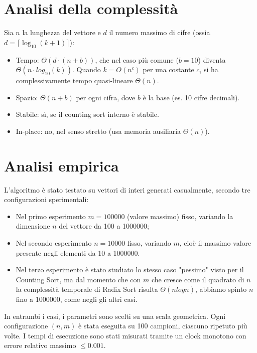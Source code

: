 \documentclass[a4paper, 12pt, oneside]{book}
\begin{document}
\section{Analisi della complessità}
Sia \(n\) la lunghezza del vettore e \(d\) il numero massimo di cifre (ossia \( d = \lceil \log_{10}(k + 1) \rceil \)): \\

\begin{itemize}
    \item Tempo: \(\Theta(d \cdot (n + b))\), che nel caso più comune (\(b = 10\)) diventa \(\Theta(n \cdot log_{10}(k))\). Quando \(k = O(n^c)\) per una costante \(c\), si ha complessivamente tempo quasi-lineare \(\Theta(n)\).
    \item Spazio: \(\Theta(n + b)\) per ogni cifra, dove \(b\) è la base (es. 10 cifre decimali).
    \item Stabile: sì, se il counting sort interno è stabile.
    \item In-place: no, nel senso stretto (usa memoria ausiliaria \(\Theta(n)\)).
\end{itemize}

\section{Analisi empirica}

L'algoritmo è stato testato su vettori di interi generati casualmente, secondo tre configurazioni sperimentali:

\begin{itemize}
    \item Nel primo esperimento \(m = 100000\) (valore massimo) fisso, variando la dimensione \(n\) del vettore da 100 a 1000000;
    \item Nel secondo esperimento \(n = 10000\) fisso, variando \(m\), cioè il massimo valore presente negli elementi da 10 a 1000000.
    \item Nel terzo esperimento è stato studiato lo stesso caso "pessimo" visto per il Counting Sort, ma dal momento che con \(m\) che cresce come il quadrato di \(n\) la complessità temporale di Radix Sort risulta \(\Theta(nlogn)\), abbiamo spinto \(n\) fino a 1000000, come negli gli altri casi.
\end{itemize}

\noindent In entrambi i casi, i parametri sono scelti su una scala geometrica. Ogni configurazione \((n, m)\) è stata eseguita su 100 campioni, ciascuno ripetuto più volte. I tempi di esecuzione sono stati misurati tramite un clock monotono con errore relativo massimo \(\leq 0.001\). \\
\end{document}
